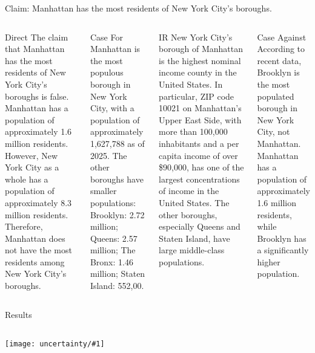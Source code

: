\documentclass[compress]{beamer}
\newcommand{\gfxu}[2]{
	\begin{center}
		\texttt{[image: uncertainty/\#1]}
	\end{center}
}
\begin{document}
\begin{frame}{Claim: Manhattan has the most residents of New York City's boroughs. }
	\begin{columns}
	\begin{block}{Direct}
		 \scriptsize The claim that Manhattan has the most residents of New York City's boroughs is false.  Manhattan has a population of approximately 1.6 million residents. However, New York City as a whole has a population of approximately 8.3 million residents. Therefore, Manhattan does not have the most residents among New York City's boroughs.  
    \end{block}

		\begin{block}{Case For}
			\scriptsize
		Manhattan is the most populous borough in New York City, with a population of approximately 1,627,788 as of 2025.  The other boroughs have smaller populations: Brooklyn: 2.72 million; Queens: 2.57 million; The Bronx: 1.46 million; Staten Island: 552,00.
	\end{block}	
    

    
    	\begin{block}{IR}
    	 \scriptsize New York City's borough of Manhattan is the highest nominal income county in the United States. In particular, ZIP code 10021 on Manhattan's Upper East Side, with more than 100,000 inhabitants and a per capita income of over \$90,000, has one of the largest concentrations of income in the United States. The other boroughs, especially Queens and Staten Island, have large middle-class populations. 
    \end{block}


		\begin{block}{Case Against}
			\scriptsize According to recent data, Brooklyn is the most populated borough in New York City, not Manhattan. Manhattan has a population of approximately 1.6 million residents, while Brooklyn has a significantly higher population.
		\end{block}					
	\end{columns}
		
		
\end{frame}


\begin{frame}{Results}
	\begin{columns}
		\column{.5\linewidth}
		\gfxu{acc_correct}{1.0}
		\column{.5\linewidth}
		\only<2>{\gfxu{acc_wrong}{1.0}}
	\end{columns}
\end{frame}
\end{document}

